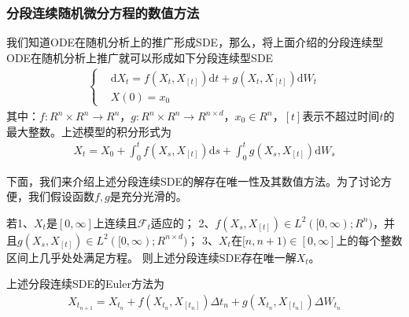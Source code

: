         \subsubsection{分段连续随机微分方程的数值方法}
            \par
            我们知道ODE在随机分析上的推广形成SDE，那么，将上面介绍的分段连续型ODE在随机分析上推广就可以形成如下分段连续型SDE
            \begin{align*}
                \left\{
                    \begin{aligned}
                    &\mathrm{d}X_t = f(X_t,X_{[t]})\mathrm{d}t + g(X_t,X_{[t]})\mathrm{d}W_t\\
                    &X(0) = x_0
                    \end{aligned}
                \right.
            \end{align*}
            其中：$f:R^n \times R^n \rightarrow R^n$，$g:R^n \times R^n \rightarrow R^{n\times d}$，$x_0 \in R^n$，$[t]$表示不超过时间$t$的最大整数。上述模型的积分形式为
            \begin{align*}
                X_t = X_0 + \int_0^t f\left(X_s,X_{[t]}\right)\mathrm{d}s + \int_0^t g\left(X_s,X_{[t]}\right)\mathrm{d}W_s
            \end{align*}
            \par
            下面，我们来介绍上述分段连续SDE的解存在唯一性及其数值方法。为了讨论方便，我们假设函数$f,g$是充分光滑的。
            \begin{theorem}[解存在唯一性]
                若1、$X_t$是$[0,\infty]$上连续且$\mathcal{F}_t$适应的；
                2、$f\left(X_s,X_{[t]}\right) \in L^2([0,\infty);R^n)$，并且$g\left(X_s,X_{[t]}\right) \in L^2([0,\infty);R^{n\times d})$；
                3、$X_t$在$[n,n+1)\in [0,\infty]$上的每个整数区间上几乎处处满足方程。
                则上述分段连续SDE存在唯一解$X_t$。
            \end{theorem}
            \par
            上述分段连续SDE的Euler方法为
            \begin{align*}
                X_{t_{n+1}} = X_{t_n} + f(X_{t_n}, X_{[t_n]})\Delta t_n + g(X_{t_n}, X_{[t_n]})\Delta W_{t_n}
            \end{align*}
